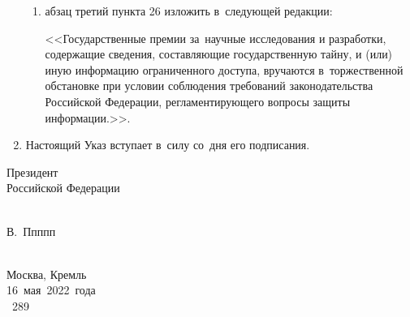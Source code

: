 \documentclass[14pt, a4paper]{extarticle}
\begin{document}
\begin{enumerate}
\begin{enumerate}[label=\asbuk*), ref=\asbuk*]
		\item абзац третий пункта 26 изложить в~следующей редакции:
		
		<<Государственные премии за~научные исследования и разработки, содержащие сведения, составляющие государственную тайну, и (или) иную информацию ограниченного доступа, вручаются в~торжественной обстановке при условии соблюдения требований законодательства Российской Федерации, регламентирующего вопросы защиты информации.>>.
	\end{enumerate}

	\item Настоящий Указ вступает в~силу со~дня его подписания.
\end{enumerate}

\filbreak
\vspace*{3cm}
\hspace*{3cm}
\begin{minipage}{.4\textwidth}
	\centering \strut
	Президент \\ Российской Федерации
\end{minipage}
\begin{minipage}{.1\textheight}
	\strut \\ В.~Ппппп
\end{minipage}  
\bigskip \\
Москва, Кремль \\
16~мая~2022~года \\
\textnumero~289\nopagebreak[4]
\end{document}

